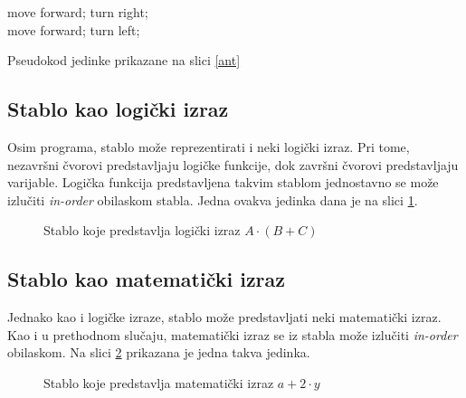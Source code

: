 \begin{algorithm}
 {
	move forward;
} {
	turn right;\\
	 {
		move forward;
	} {
		turn left;
	}
}

	\caption{Pseudokod jedinke prikazane na slici \ref{ant}}
	\label{pseudokod}
	\centering
\end{algorithm}

\subsection{Stablo kao logički izraz}

Osim programa, stablo može reprezentirati i neki logički izraz. Pri tome, nezavršni čvorovi predstavljaju logičke funkcije, dok završni čvorovi predstavljaju varijable. Logička funkcija predstavljena takvim stablom jednostavno se može izlučiti \textit{in-order} obilaskom stabla. Jedna ovakva jedinka dana je na slici \ref{logTree}. 
\\
\begin{figure}[H]
	\centering
	\caption{Stablo koje predstavlja logički izraz $A  \cdot (B + C)$}
	\label{logTree}
\end{figure}


\subsection{Stablo kao matematički izraz}

Jednako kao i logičke izraze, stablo može predstavljati neki matematički izraz. Kao i u prethodnom slučaju, matematički izraz se iz stabla može izlučiti \textit{in-order} obilaskom. Na slici \ref{matTree} prikazana je jedna takva jedinka.

\begin{figure}[H]
	\centering
	\caption{Stablo koje predstavlja matematički izraz $a + 2 \cdot y$}
	\label{matTree}
\end{figure}

